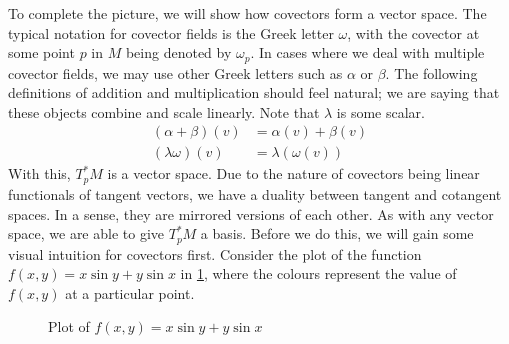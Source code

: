 \documentclass[a4paper,12pt]{article}
\begin{document}
To complete the picture, we will show how covectors form a vector space.
The typical notation for covector fields is the Greek letter $\omega$, with the covector at some point $p$ in $M$ being denoted by $\omega_p$.
In cases where we deal with multiple covector fields, we may use other Greek letters such as $\alpha$ or $\beta$.
The following definitions of addition and multiplication should feel natural; we are saying that these objects combine and scale linearly.
Note that $\lambda$ is some scalar.
\begin{align*}
    (\alpha + \beta)(v) &= \alpha(v) + \beta(v) \\
    (\lambda\omega)(v) &= \lambda(\omega(v))
\end{align*}
With this, $T^*_p M$ is a vector space.
Due to the nature of covectors being linear functionals of tangent vectors, we have a duality between tangent and cotangent spaces.
In a sense, they are mirrored versions of each other.
As with any vector space, we are able to give $T^*_p M$ a basis.
Before we do this, we will gain some visual intuition for covectors first.
Consider the plot of the function $f(x,y) = x\sin y + y\sin x$ in \cref{fig:heatmap_fxy}, where the colours represent the value of $f(x,y)$ at a particular point.

\begin{figure}[!htbp]
\centering
\tikzexternalenable
{}
\tikzexternaldisable
\caption{Plot of $f(x,y) = x\sin y + y\sin x$}
\label{fig:heatmap_fxy}
\end{figure}
\end{document}

